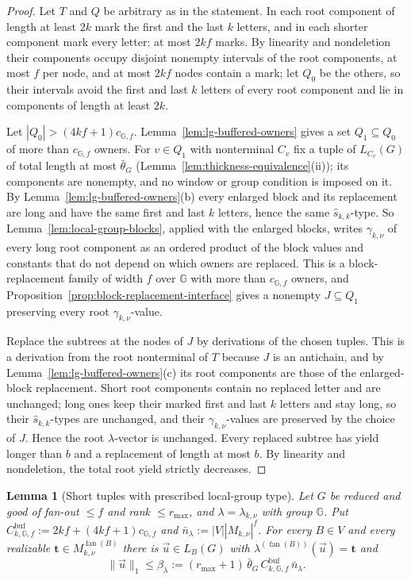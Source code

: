 \documentclass[11pt]{article}
\numberwithin{equation}{section}
\theoremstyle{plain}
\newtheorem{lemma}[theorem]{Lemma}
\theoremstyle{definition}
\theoremstyle{remark}
\newcommand{\tuple}[1]{\vec{#1}}
\newcommand{\fan}{\operatorname{fan}}
\theoremstyle{plain}
\begin{document}
\begin{proof}
Let $T$ and $Q$ be arbitrary as in the statement.
In each root component of length at least $2k$ mark the first
and the last $k$ letters, and in each shorter component mark every letter: at
most $2kf$ marks.   By linearity and
nondeletion their components occupy disjoint nonempty intervals of the root
components, at most $f$ per node, and at most $2kf$ nodes contain a mark; let
$Q_0$ be the others, so their intervals avoid the first and last $k$ letters of
every root component and lie in components of length at least $2k$.

Let $|Q_0|>(4kf+1)c_{{\mathbb G},f}$.  Lemma~\ref{lem:lg-buffered-owners} gives a set
$Q_1\subseteq Q_0$ of more than $c_{{\mathbb G},f}$ owners.  For $v\in Q_1$ with nonterminal
$C_v$ fix a tuple of $L_{C_v}(G)$ of total length at most $\bar\theta_G$
(Lemma~\ref{lem:thickness-equivalence}(ii)); its components are nonempty, and no
window or group condition is imposed on it.  By
Lemma~\ref{lem:lg-buffered-owners}(b) every enlarged block and its replacement
are long and have the same first and last $k$ letters, hence the same
$\widehat s_{k,k}$-type.  So Lemma~\ref{lem:local-group-blocks}, applied with the
enlarged blocks, writes $\gamma_{k,\nu}$ of every long root component as an
ordered product of the block values and constants that do not depend on which
owners are replaced.  This is a block-replacement family of width $f$ over ${\mathbb G}$
with more than $c_{{\mathbb G},f}$ owners, and
Proposition~\ref{prop:block-replacement-interface} gives a nonempty $J\subseteq Q_1$
preserving every root $\gamma_{k,\nu}$-value.

Replace the subtrees at the nodes of $J$ by derivations of the chosen tuples.
This is a derivation from the root nonterminal of $T$ because
$J$ is an antichain, and by
Lemma~\ref{lem:lg-buffered-owners}(c) its root components are those of the
enlarged-block replacement.  Short root components contain no replaced letter
and are unchanged; long ones keep their marked first and last $k$ letters and
stay long, so their $\widehat s_{k,k}$-types are unchanged, and their
$\gamma_{k,\nu}$-values are preserved by the choice of $J$.  Hence the root
$\lambda$-vector is unchanged.
Every replaced subtree has yield longer than $b$
and a replacement of length at most $b$. By linearity and
nondeletion, the total root yield strictly decreases.
\end{proof}

\begin{lemma}[Short tuples with prescribed local-group type]
\label{lem:local-group-shortest}
Let $G$ be reduced and good of fan-out $\le f$ and rank $\le r_{\max}$, and
$\lambda=\lambda_{k,\nu}$ with group ${\mathbb G}$.  Put
$C^{\mathrm{buf}}_{k,{\mathbb G},f}:=2kf+(4kf+1)c_{{\mathbb G},f}$ and
$\bar n_\lambda:=|V||M_{k,\nu}|^f$.  For every $B\in V$ and every realizable
$\mathbf t\in M_{k,\nu}^{\fan(B)}$ there is $\tuple u\in L_B(G)$ with
$\lambda^{(\fan(B))}(\tuple u)=\mathbf t$ and
\[
 \|\tuple u\|_1\le\beta_\lambda:=(r_{\max}+1)\,\bar\theta_G\,
 C^{\mathrm{buf}}_{k,{\mathbb G},f}\,\bar n_\lambda .
\]
\end{lemma}
\end{document}
